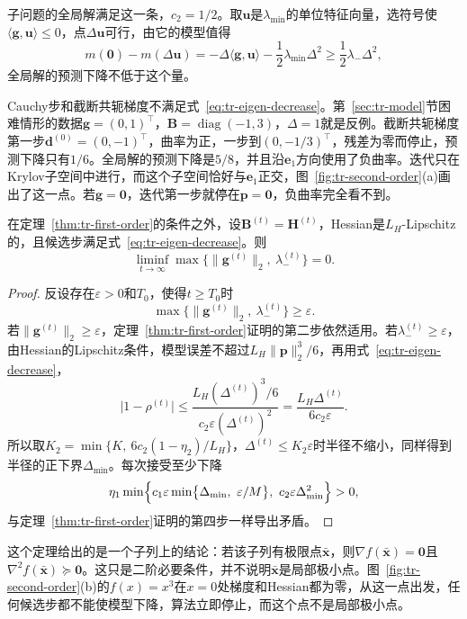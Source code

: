 子问题的全局解满足这一条，$c_2=1/2$。取$\bm{u}$是$\lambda_{\min}$的单位特征向量，选符号使$\langle\bm{g},\bm{u}\rangle\leq0$，点$\Delta\bm{u}$可行，由它的模型值得
\[
 m(\bm{0})-m(\Delta\bm{u})=-\Delta\langle\bm{g},\bm{u}\rangle-\frac12\lambda_{\min}\Delta^2\geq\frac12\lambda_-\Delta^2,
\]
全局解的预测下降不低于这个量。

Cauchy步和截断共轭梯度不满足式~\eqref{eq:tr-eigen-decrease}。第~\ref{sec:tr-model}节困难情形的数据$\bm{g}=(0,1)^\top$，$\bm{B}=\operatorname{diag}(-1,3)$，$\Delta=1$就是反例。截断共轭梯度第一步$\bm{d}^{(0)}=(0,-1)^\top$，曲率为正，一步到$(0,-1/3)^\top$，残差为零而停止，预测下降只有$1/6$。全局解的预测下降是$5/8$，并且沿$\bm{e}_1$方向使用了负曲率。迭代只在Krylov子空间中进行，而这个子空间恰好与$\bm{e}_1$正交，图~\ref{fig:tr-second-order}(a)画出了这一点。若$\bm{g}=\bm{0}$，迭代第一步就停在$\bm{p}=\bm{0}$，负曲率完全看不到。

\begin{theorem}[二阶下极限]
 \label{thm:tr-second-order}
 在定理~\ref{thm:tr-first-order}的条件之外，设$\bm{B}^{(t)}=\bm{H}^{(t)}$，Hessian是$L_H$-Lipschitz的，且候选步满足式~\eqref{eq:tr-eigen-decrease}。则
 \begin{equation}
  \liminf_{t\to\infty}\max\bigl\{\lVert\bm{g}^{(t)}\rVert_2,\ \lambda^{(t)}_-\bigr\}=0.
  \label{eq:tr-second-order}
 \end{equation}
\end{theorem}

\begin{proof}
 反设存在$\varepsilon>0$和$T_0$，使得$t\geq T_0$时
 \[
  \max\{\lVert\bm{g}^{(t)}\rVert_2,\ \lambda^{(t)}_-\}\geq\varepsilon.
 \]
 若$\lVert\bm{g}^{(t)}\rVert_2\geq\varepsilon$，定理~\ref{thm:tr-first-order}证明的第二步依然适用。若$\lambda^{(t)}_-\geq\varepsilon$，由Hessian的Lipschitz条件，模型误差不超过$L_H\lVert\bm{p}\rVert_2^3/6$，再用式~\eqref{eq:tr-eigen-decrease}，
 \[
  \lvert1-\rho^{(t)}\rvert\leq\frac{L_H(\Delta^{(t)})^3/6}{c_2\varepsilon(\Delta^{(t)})^2}=\frac{L_H\Delta^{(t)}}{6c_2\varepsilon}.
 \]
 所以取$K_2=\min\{K,\ 6c_2(1-\eta_2)/L_H\}$，$\Delta^{(t)}\leq K_2\varepsilon$时半径不缩小，同样得到半径的正下界$\Delta_{\min}$。每次接受至少下降
 \[
  \eta_1\min\Bigl\{c_1\varepsilon\min\bigl\{\Delta_{\min},\ \varepsilon/M\bigr\},\ c_2\varepsilon\Delta_{\min}^2\Bigr\}>0,
 \]
 与定理~\ref{thm:tr-first-order}证明的第四步一样导出矛盾。
\end{proof}

这个定理给出的是一个子列上的结论：若该子列有极限点$\bar{\bm{x}}$，则$\nabla f(\bar{\bm{x}})=\bm{0}$且$\nabla^2f(\bar{\bm{x}})\succeq\bm{0}$。这只是二阶必要条件，并不说明$\bar{\bm{x}}$是局部极小点。图~\ref{fig:tr-second-order}(b)的$f(x)=x^3$在$x=0$处梯度和Hessian都为零，从这一点出发，任何候选步都不能使模型下降，算法立即停止，而这个点不是局部极小点。

